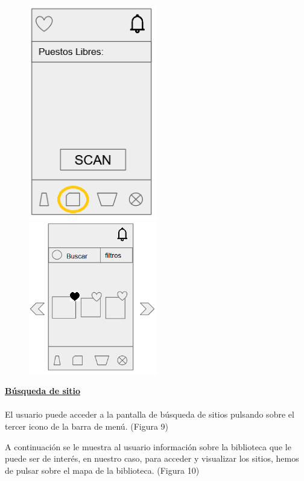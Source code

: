 \documentclass[12pt]{article}
\begin{document}
\begin{figure}[!h]
\centering
{}
	\includegraphics[width=0.5\textwidth]{busquedaLibros1.png} 
\endminipage
{}
	\includegraphics[width=0.5\textwidth]{busquedaLibros2.png} 
\endminipage
\end{figure}

\textbf{\underline{Búsqueda de sitio}} \\
\\
El usuario puede acceder a la pantalla de búsqueda de sitios pulsando sobre el tercer icono de la barra de menú. (Figura 9) 

A continuación se le muestra al usuario información sobre la biblioteca que le puede ser de interés, en nuestro caso, para acceder y visualizar los sitios, hemos de pulsar sobre el mapa de la biblioteca. (Figura 10) 
\end{document}
